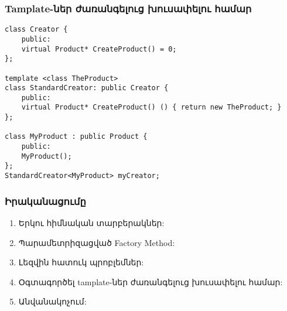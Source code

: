 \documentclass{beamer}
\begin{document}
\begin{frame}[fragile]\frametitle{Tamplate-ներ ժառանգելուց խուսափելու համար}
\begin{english}
\begin{verbatim}
class Creator {
    public:
    virtual Product* CreateProduct() = 0;
};

template <class TheProduct>
class StandardCreator: public Creator {
    public:
    virtual Product* CreateProduct() () { return new TheProduct; }
};

class MyProduct : public Product {
    public:
    MyProduct();
};
StandardCreator<MyProduct> myCreator;
\end{verbatim}
\end{english}
\end{frame}

\begin{frame}\frametitle{Իրականացումը}
\begin{enumerate}
    \item Երկու հիմնական տարբերակներ: \vspace{0.5cm}
    \item Պարամետրիզացված Factory Method: \vspace{0.5cm}
    \item Լեզվին հատուկ պրոբլեմներ: \vspace{0.5cm}
    \item Օգտագործել tamplate-ներ ժառանգելուց խուսափելու համար: \vspace{0.5cm}
    \item Անվանակոչում: \vfill
\end{enumerate}
\end{frame}
\end{document}
